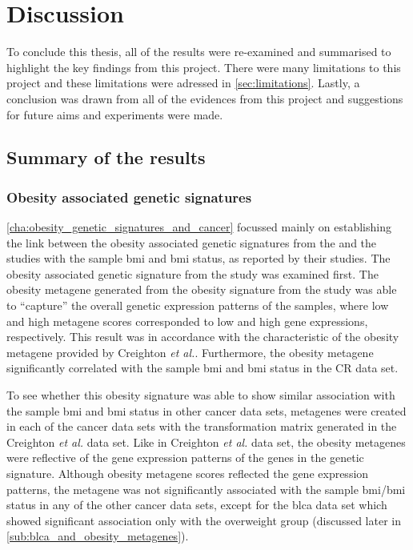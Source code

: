\chapter{Discussion}
\label{cha:discussion}

To conclude this thesis, all of the results were re-examined and summarised to highlight the key findings from this project.
There were many limitations to this project and these limitations were adressed in \cref{sec:limitations}.
Lastly, a conclusion was drawn from all of the evidences from this project and suggestions for future aims and experiments were made.


\section{Summary of the results}
\label{sec:summary_of_the_results}


\subsection{Obesity associated genetic signatures}
\label{sub:obesity_associated_genetic_signatures}

\cref{cha:obesity_genetic_signatures_and_cancer} focussed mainly on establishing the link between the obesity associated genetic signatures from the \citet{Creighton2012} and the \citet{Fuentes-Mattei2014} studies with the sample \gls{bmi} and \gls{bmi} status, as reported by their studies.
The obesity associated genetic signature from the \citet{Creighton2012} study was examined first.
The obesity metagene generated from the obesity signature from the \citet{Creighton2012} study was able to ``capture'' the overall genetic expression patterns of the samples, where low and high metagene scores  corresponded to low and high gene expressions, respectively.
This result was in accordance with the characteristic of the obesity metagene provided by Creighton \textit{et al.}.
Furthermore, the obesity metagene significantly correlated with the sample \gls{bmi} and \gls{bmi} status in the CR data set.

To see whether this obesity signature was able to show similar association with the sample \gls{bmi} and \gls{bmi} status in other cancer data sets, metagenes were created in each of the cancer data sets with the transformation matrix generated in the Creighton \textit{et al.} data set.
Like in Creighton \textit{et al.} data set, the obesity metagenes were reflective of the gene expression patterns of the genes in the genetic signature.
Although obesity metagene scores reflected the gene expression patterns, the metagene was not significantly associated with the sample \gls{bmi}/\gls{bmi} status in any of the other cancer data sets, except for  the \gls{blca} data set which showed significant association only with the overweight group (discussed later in \cref{sub:blca_and_obesity_metagenes}).


